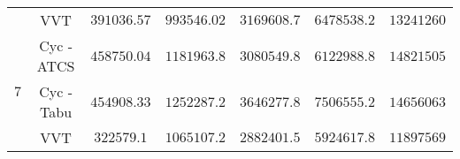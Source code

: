 \begin{table}
{\begin{tabular}{ccccccc}
      & VVT   &$ 391036.57 $&$ 993546.02 $&$ 3169608.7 $&$ 6478538.2 $&$ 13241260$ \\
\multirow{3}[0]{*}{$7$} & Cyc - ATCS &$ 458750.04 $&$ 1181963.8 $&$ 3080549.8 $&$ 6122988.8 $&$ 14821505$ \\
      & Cyc - Tabu &$ 454908.33 $&$ 1252287.2 $&$ 3646277.8 $&$ 7506555.2 $&$ 14656063$ \\
      & VVT   &$ 322579.1 $&$ 1065107.2 $&$ 2882401.5 $&$ 5924617.8 $&$ 11897569$ \\
\bottomrule
\end{tabular}
}
\label{tab:resultmodel206}
\end{table}